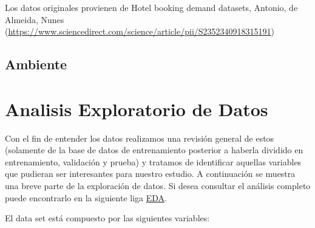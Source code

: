 \documentclass[
]{book}
\begin{document}
Los datos originales provienen de Hotel booking demand datasets, Antonio, de Almeida, Nunes (\url{https://www.sciencedirect.com/science/article/pii/S2352340918315191})

\hypertarget{ambiente}{%
\section{Ambiente}\label{ambiente}}

\hypertarget{analisis-exploratorio-de-datos}{%
\chapter{Analisis Exploratorio de Datos}\label{analisis-exploratorio-de-datos}}

Con el fin de entender los datos realizamos una revisión general de estos (solamente de la base de datos de entrenamiento posterior a haberla dividido en entrenamiento, validación y prueba) y tratamos de identificar aquellas variables que pudieran ser interesantes para nuestro estudio. A continuación se muestra una breve parte de la exploración de datos. Si desea consultar el análisis completo puede encontrarlo en la siguiente liga \href{https://github.com/marcoyel21/hotel_cancelation_ML21/blob/main/final/EDA_Cancelaciones.Rmd}{EDA}.

El data set está compuesto por las siguientes variables:
\end{document}
